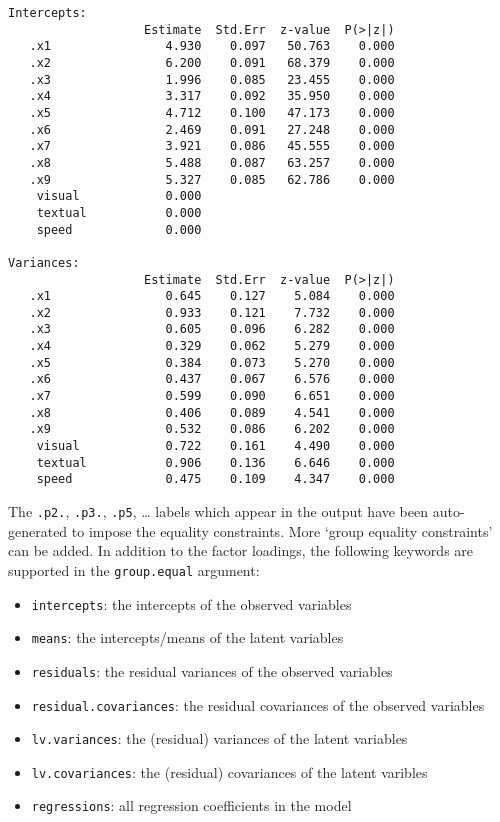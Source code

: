 \begin{verbatim}
Intercepts:
                   Estimate  Std.Err  z-value  P(>|z|)
   .x1                4.930    0.097   50.763    0.000
   .x2                6.200    0.091   68.379    0.000
   .x3                1.996    0.085   23.455    0.000
   .x4                3.317    0.092   35.950    0.000
   .x5                4.712    0.100   47.173    0.000
   .x6                2.469    0.091   27.248    0.000
   .x7                3.921    0.086   45.555    0.000
   .x8                5.488    0.087   63.257    0.000
   .x9                5.327    0.085   62.786    0.000
    visual            0.000                           
    textual           0.000                           
    speed             0.000                           

Variances:
                   Estimate  Std.Err  z-value  P(>|z|)
   .x1                0.645    0.127    5.084    0.000
   .x2                0.933    0.121    7.732    0.000
   .x3                0.605    0.096    6.282    0.000
   .x4                0.329    0.062    5.279    0.000
   .x5                0.384    0.073    5.270    0.000
   .x6                0.437    0.067    6.576    0.000
   .x7                0.599    0.090    6.651    0.000
   .x8                0.406    0.089    4.541    0.000
   .x9                0.532    0.086    6.202    0.000
    visual            0.722    0.161    4.490    0.000
    textual           0.906    0.136    6.646    0.000
    speed             0.475    0.109    4.347    0.000
\end{verbatim}

The \texttt{.p2.}, \texttt{.p3.}, \texttt{.p5}, \ldots{} labels which
appear in the output have been auto-generated to impose the equality
constraints. More `group equality constraints' can be added. In addition
to the factor loadings, the following keywords are supported in the
\texttt{group.equal} argument:

\begin{itemize}
\tightlist
\item
  \texttt{intercepts}: the intercepts of the observed variables
\item
  \texttt{means}: the intercepts/means of the latent variables
\item
  \texttt{residuals}: the residual variances of the observed variables
\item
  \texttt{residual.covariances}: the residual covariances of the
  observed variables
\item
  \texttt{lv.variances}: the (residual) variances of the latent
  variables
\item
  \texttt{lv.covariances}: the (residual) covariances of the latent
  varibles
\item
  \texttt{regressions}: all regression coefficients in the model
\end{itemize}

